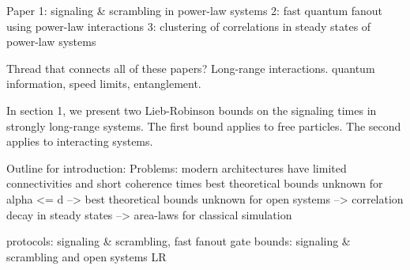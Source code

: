 Paper 1: signaling & scrambling in power-law systems
2: fast quantum fanout using power-law interactions
3: clustering of correlations in steady states of power-law systems

Thread that connects all of these papers? Long-range interactions. quantum information, speed limits, entanglement.

In section 1, we present two Lieb-Robinson bounds on the signaling times in strongly long-range systems. The first bound applies to free particles. The second applies to interacting systems.

Outline for introduction:
Problems: modern architectures have limited connectivities and short coherence times
best theoretical bounds unknown for alpha <= d -->
best theoretical bounds unknown for open systems --> correlation decay in steady states --> area-laws for classical simulation

protocols: signaling & scrambling, fast fanout gate
bounds: signaling & scrambling and open systems LR
